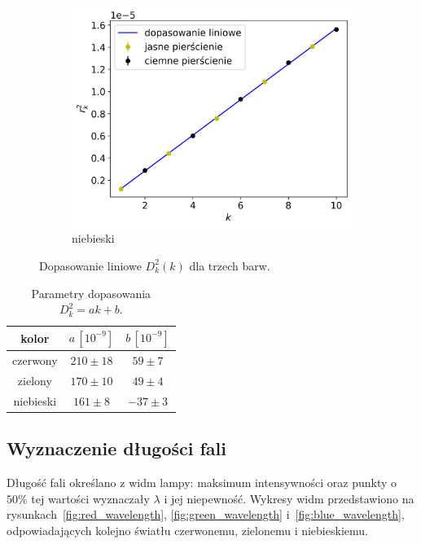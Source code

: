 \documentclass[12pt]{article}
\begin{document}
\begin{figure}[H]
\begin{subfigure}{0.3\textwidth}
		\includegraphics[width=\linewidth]{blue}
		\caption{niebieski}
	\end{subfigure}
	\caption{Dopasowanie liniowe \(D_k^2(k)\) dla trzech barw.}
	\label{fig:line_graphs}
\end{figure}

\begin{table}[H]
	\centering
	\begin{tabular}{c|cc}
		\toprule
		kolor     & \(a\,[10^{-9}]\) & \(b\,[10^{-9}]\) \\
		\midrule
		czerwony  & \(210 \pm 18\)   & \(59 \pm 7\)     \\
		zielony   & \(170 \pm 10\)   & \(49 \pm 4\)     \\
		niebieski & \(161 \pm 8\)    & \(-37 \pm 3\)    \\
		\bottomrule
	\end{tabular}
	\caption{Parametry dopasowania \(D_k^2 = a k + b\).}
	\label{tab:lines_params}
\end{table}

\subsection{Wyznaczenie długości fali}

Długość fali określano z widm lampy: maksimum intensywności oraz punkty o~\(50\%\) tej wartości wyznaczały \(\lambda\) i jej niepewność.
Wykresy widm przedstawiono na rysunkach~\ref{fig:red_wavelength}, \ref{fig:green_wavelength} i~\ref{fig:blue_wavelength}, odpowiadających kolejno światłu czerwonemu, zielonemu i niebieskiemu.
\end{document}
